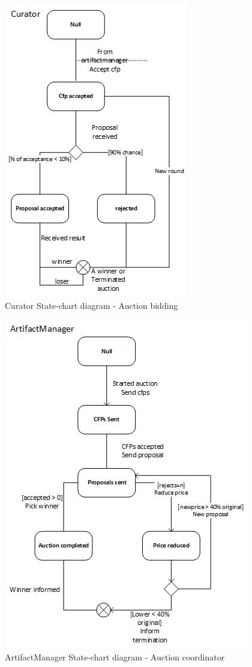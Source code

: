 \documentclass[a4paper, 11pt]{article}
\begin{document}
\begin{figure}[H]
	\caption{Curator State-chart diagram - Auction bidding}
	\centering
	\includegraphics[scale=0.9]{./images/curatorUML.jpg}
\end{figure}
\begin{figure}[H]
	\caption{ArtifactManager State-chart diagram - Auction coordinator}
	\centering
	\includegraphics[scale=0.9]{./images/artifactmanagerUML.jpg}
\end{figure}
\end{document}
